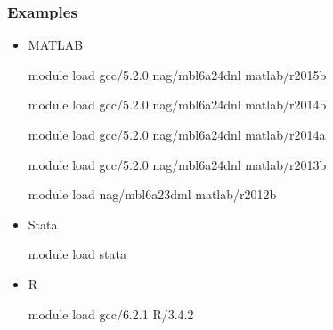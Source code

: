 \documentclass{beamer}
\begin{document}
\begin{frame}
\frametitle{Examples}
\begin{itemize}
\item MATLAB \vspace{0.2cm}
\begin{semiverbatim}
module load gcc/5.2.0 nag/mbl6a24dnl matlab/r2015b
\end{semiverbatim} \vspace{-0.4cm}
\begin{semiverbatim}
module load gcc/5.2.0 nag/mbl6a24dnl matlab/r2014b
\end{semiverbatim} \vspace{-0.4cm}
\begin{semiverbatim}
module load gcc/5.2.0 nag/mbl6a24dnl matlab/r2014a
\end{semiverbatim} \vspace{-0.4cm}
\begin{semiverbatim}
module load gcc/5.2.0 nag/mbl6a24dnl matlab/r2013b
\end{semiverbatim} \vspace{-0.4cm}
\begin{semiverbatim}
module load nag/mbl6a23dml matlab/r2012b
\end{semiverbatim} 
\item Stata \vspace{0.2cm}
\begin{semiverbatim}
module load stata
\end{semiverbatim} 
\item R \vspace{0.2cm}
\begin{semiverbatim}
module load gcc/6.2.1 R/3.4.2 
\end{semiverbatim}
\end{itemize}
\end{frame}
\end{document}
